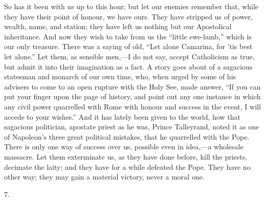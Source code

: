 So has it been with us up to this hour; but let our
enemies remember that, while they have their point of
honour, we have ours. They have stripped us of power,
wealth, name, and station; they have left us nothing but
our Apostolical inheritance. And now they wish to take
from us the ``little ewe-lamb,'' which is our
only treasure. There was a saying of old, ``Let alone
Camarina, for 'tis best let alone.'' Let them, as
sensible men,—I do not say, accept Catholicism as
true, but admit it into their imagination as a fact. A
story goes about of a sagacious statesman and monarch of
our own time, who, when urged by some of his advisers to
come to an open rupture with the Holy See, made answer,
``If you can put your finger upon the page of
history, and point out any one instance in which any
civil power quarrelled with Rome with honour and success
in the event, I will accede to your wishes.'' And it
has lately been given to the world, how that sagacious
politician, apostate priest as he was, Prince Talleyrand,
noted it as one of Napoleon's three great political
mistakes, that he quarrelled with the Pope. There is only
one way of success over us, possible even in idea,—a
wholesale massacre. Let them exterminate us, as they have
done before, kill the priests, decimate the laity; and
they have for a while defeated the Pope. They have no
other way; they may gain a material victory, never a
moral one.

7.

